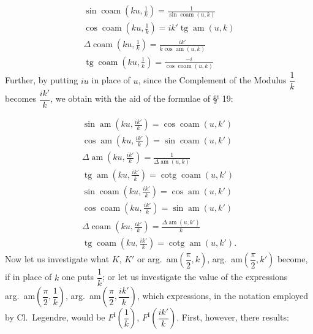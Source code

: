 \documentclass{article}
\begin{document}
\[
\begin{gathered}
\sin\operatorname{coam}\left(ku,\frac{1}{k}\right)=\frac{1}{\sin\operatorname{coam}(u,k)}\\[1.5ex]
\cos\operatorname{coam}\left(ku,\frac{1}{k}\right)=ik'\operatorname{tg}\operatorname{am}(u,k)\\[1.5ex]
\Delta\operatorname{coam}\left(ku,\frac{1}{k}\right)=\frac{ik'}{k\cos\operatorname{am}(u,k)}\\[1.5ex]
\operatorname{tg}\operatorname{coam}\left(ku,\frac{1}{k}\right)=\frac{-i}{\cos\operatorname{coam}(u,k)}
\end{gathered}
\]
Further, by putting $iu$ in place of $u$, since the Complement of the Modulus $\dfrac{1}{k}$ becomes $\dfrac{ik'}{k}$, we obtain with the aid of the formulae of §$^{\mathrm{i}}$ 19:

\[
\begin{gathered}
\sin\operatorname{am}\left(ku,\frac{ik'}{k}\right)=\cos\operatorname{coam}(u,k')\\[1.5ex]
\cos\operatorname{am}\left(ku,\frac{ik'}{k}\right)=\sin\operatorname{coam}(u,k')\\[1.5ex]
\Delta\operatorname{am}\left(ku,\frac{ik'}{k}\right)=\frac{1}{\Delta\operatorname{am}(u,k)}\\[1.5ex]
\operatorname{tg}\operatorname{am}\left(ku,\frac{ik'}{k}\right)=\operatorname{cotg}\operatorname{coam}(u,k')\\[1.5ex]
\sin\operatorname{coam}\left(ku,\frac{ik'}{k}\right)=\cos\operatorname{am}(u,k')\\[1.5ex]
\cos\operatorname{coam}\left(ku,\frac{ik'}{k}\right)=\sin\operatorname{am}(u,k')\\[1.5ex]
\Delta\operatorname{coam}\left(ku,\frac{ik'}{k}\right)=\frac{\Delta\operatorname{am}(u,k')}{k}\\[1.5ex]
\operatorname{tg}\operatorname{coam}\left(ku,\frac{ik'}{k}\right)=\operatorname{cotg}\operatorname{am}(u,k').
\end{gathered}
\]
Now let us investigate what $K$, $K'$ or arg.\ am$\left(\dfrac{\pi}{2},k\right)$, arg.\ am$\left(\dfrac{\pi}{2},k'\right)$ become, if in place of $k$ one puts $\dfrac{1}{k}$; or let us investigate the value of the expressions arg.\ am$\left(\dfrac{\pi}{2},\dfrac{1}{k}\right)$, arg.\ am$\left(\dfrac{\pi}{2},\dfrac{ik'}{k}\right)$, which expressions, in the notation employed by Cl.\ Legendre, would be $F^{\mathrm{I}}\left(\dfrac{1}{k}\right)$, $F^{\mathrm{I}}\left(\dfrac{ik'}{k}\right)$. First, however, there results:
\end{document}
